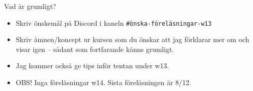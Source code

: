 


\ifkompendium\else


\begin{SlideExtra}{Vad är grumligt?}\SlideFontSmall

\begin{itemize}
\item Skriv önskemål på Discord i kaneln \texttt{\#önska-föreläsningar-w13} 
\item  Skriv ämnen/koncept ur kursen som du önskar att jag förklarar mer om och visar igen -- sådant som fortfarande känns grumligt. 
\item Jag kommer också ge tips inför tentan under w13.  
\item OBS! Inga föreläsningar w14. Sista föreläsningen är 8/12.
\end{itemize}

\end{SlideExtra}


%
%

\fi